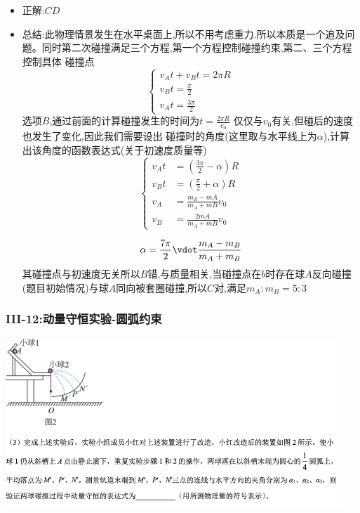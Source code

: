 \documentclass{article}
\begin{document}
\begin{itemize}
    \item 正解:\quad $CD$
    \item 总结:\quad 此物理情景发生在水平桌面上,所以不用考虑重力.所以本质是一个追及问题。同时第二次碰撞满足三个方程,第一个方程控制碰撞约束,第二、三个方程控制具体
          碰撞点
          $$
              \begin{cases}
                  v_{A} t + v_{B} t = 2 \pi R \\
                  v_{B} t  = \frac{\pi}{2}    \\
                  v_{A} t = \frac{3\pi}{2}
              \end{cases}
          $$
          选项$B$,通过前面的计算碰撞发生的时间为$t = \frac{2\pi R}{v_{0}}$ 仅仅与$v_{0}$有关,但碰后的速度也发生了变化,因此我们需要设出
          碰撞时的角度(这里取与水平线上为$\alpha$),计算出该角度的函数表达式(关于初速度质量等)
          $$
              \begin{cases}
                  v_{A} t & = (\frac{3\pi}{2} - \alpha) R           \\
                  v_{B} t & = (\frac{\pi}{2} + \alpha) R            \\
                  v_{A}   & = \frac{m_{B} - m{A}}{m_{A}+m{B}} v_{0} \\
                  v_{B}   & = \frac{2 m{A}}{m_{A}+m{B}} v_{0}
              \end{cases}
          $$

          $$
              \alpha = \frac{7 \pi}{2} \vdot \frac{m_{A} - m_{B}}{m_{A} + m_{B}}
          $$
          其碰撞点与初速度无关所以$B$错,与质量相关,当碰撞点在$b$时存在球$A$反向碰撞(题目初始情况)与球$A$同向被套圈碰撞,所以$C$对,满足$m_{A} : m_{B} = 5 : 3$
\end{itemize}

\vspace{2em}

\subsubsection{III-12:动量守恒实验-圆弧约束}
\includegraphics[width=0.95\textwidth,keepaspectratio]{./pictures/1.2-4.png}
\end{document}
